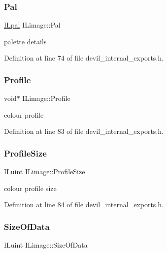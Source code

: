 \subsubsection{\texorpdfstring{Pal}{Pal}}
{\footnotesize\ttfamily \hyperlink{structILpal}{I\+Lpal} I\+Limage\+::\+Pal}



palette details 



Definition at line 74 of file devil\+\_\+internal\+\_\+exports.\+h.

\mbox{\label{structILimage_a78a95799c50680f0301e83b3f09c010f}} 
\subsubsection{\texorpdfstring{Profile}{Profile}}
{\footnotesize\ttfamily void$\ast$ I\+Limage\+::\+Profile}



colour profile 



Definition at line 83 of file devil\+\_\+internal\+\_\+exports.\+h.

\mbox{\label{structILimage_a03dcb37bc626f621f4c638fde928bf64}} 
\subsubsection{\texorpdfstring{Profile\+Size}{ProfileSize}}
{\footnotesize\ttfamily I\+Luint I\+Limage\+::\+Profile\+Size}



colour profile size 



Definition at line 84 of file devil\+\_\+internal\+\_\+exports.\+h.

\mbox{\label{structILimage_a9e84436c94d9cd5afad59be12dff753b}} 
\subsubsection{\texorpdfstring{Size\+Of\+Data}{SizeOfData}}
{\footnotesize\ttfamily I\+Luint I\+Limage\+::\+Size\+Of\+Data}



